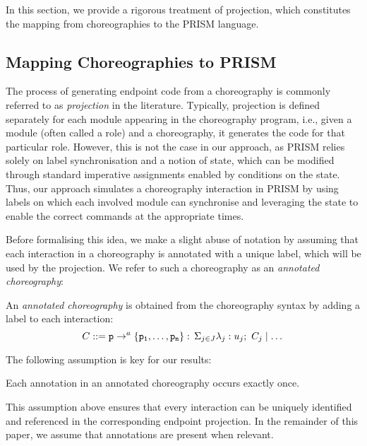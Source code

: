 In this section, we provide a rigorous treatment of projection, which
constitutes the mapping from choreographies to the PRISM language.
%

\subsection{Mapping Choreographies to PRISM} 
%
The process of generating endpoint code from a choreography is
commonly referred to as {\em projection} in the literature.
Typically, projection is defined separately for each module appearing
in the choreography program, i.e., given a module (often called a
role) and a choreography, it generates the code for that particular
role.  However, this is not the case in our approach, as PRISM relies
solely on label synchronisation and a notion of state, which can be
modified through standard imperative assignments enabled by conditions
on the state.
%
Thus, our approach simulates a choreography interaction in PRISM by
using labels on which each involved module can synchronise and
leveraging the state to enable the correct commands at the appropriate
times.

Before formalising this idea, we make a slight abuse of notation by
assuming that each interaction in a choreography is annotated with a
unique label, which will be used by the projection. We refer to such a
choreography as an {\em annotated choreography}:
%
\begin{definition}
  An \emph{annotated choreography} is obtained from the choreography
  syntax by adding a label to each interaction:
  \[C ::= \mathtt{p}\rightarrow^{a} \{\mathtt{\mathtt{p}_1,\ldots,\mathtt{p}_n}\}:\,\Sigma_{j\in J}\lambda_j: u_j;\ C_j \mid\dots\]
\end{definition}
%
The following assumption is key for our results: 
\begin{assumption}
  Each annotation in an annotated choreography occurs exactly once.
\end{assumption}
This assumption above ensures that every interaction can be uniquely
identified and referenced in the corresponding endpoint projection. In
the remainder of this paper, we assume that annotations are present
when relevant.


